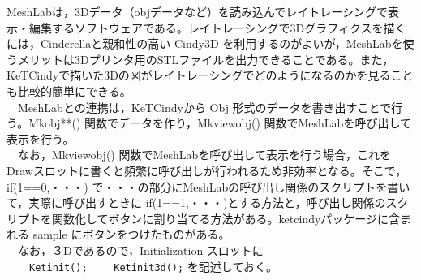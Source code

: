 \documentclass[papersize,a4paper,12pt,uplatex]{jsarticle}
\begin{document}
MeshLabは，3Dデータ（objデータなど）を読み込んでレイトレーシングで表示・編集するソフトウェアである。レイトレーシングで3Dグラフィクスを描くには，Cinderellaと親和性の高い Cindy3D を利用するのがよいが，MeshLabを使うメリットは3Dプリンタ用のSTLファイルを出力できることである。また，KeTCindyで描いた3Dの図がレイトレーシングでどのようになるのかを見ることも比較的簡単にできる。\\
　MeshLabとの連携は，KeTCindyから Obj 形式のデータを書き出すことで行う。Mkobj**() 関数でデータを作り，Mkviewobj() 関数でMeshLabを呼び出して表示を行う。\\
　なお，Mkviewobj() 関数でMeshLabを呼び出して表示を行う場合，これをDrawスロットに書くと頻繁に呼び出しが行われるため非効率となる。そこで，if(1==0,・・・) で・・・の部分にMeshLabの呼び出し関係のスクリプトを書いて，実際に呼び出すときに if(1==1,・・・)とする方法と，呼び出し関係のスクリプトを関数化してボタンに割り当てる方法がある。ketcindyパッケージに含まれる sample にボタンをつけたものがある。\\
　なお，３Dであるので，Initialization スロットに\\
　　\verb|Ketinit();|
　　\verb|Ketinit3d();|
を記述しておく。
\end{document}
